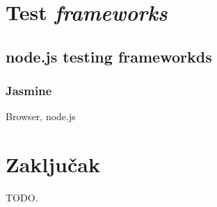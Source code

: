 \documentclass[times, utf8, seminar]{fit}
\begin{document}
\chapter{Test \emph{frameworks}}

\section{node.js testing frameworkds}

\subsection{Jasmine}

Browser, node.js














\chapter{Zaključak}

TODO.



\end{document}
